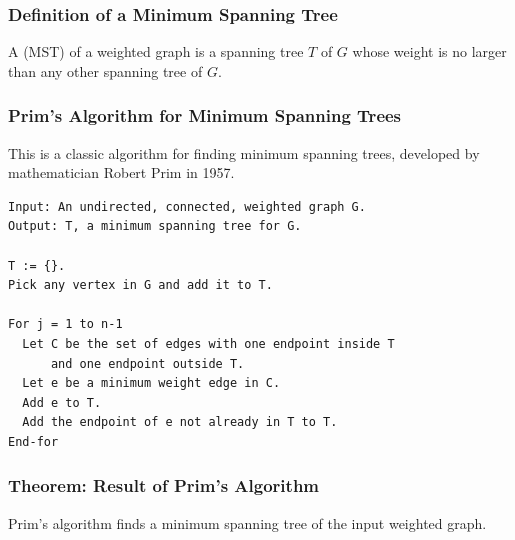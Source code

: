 \subsubsection*{Definition of a Minimum Spanning Tree}
A  (MST) of a weighted graph is a spanning tree $T$ of $G$ whose weight is no larger than any other spanning tree of $G$.

\subsubsection*{Prim's Algorithm for Minimum Spanning Trees}
This is a classic algorithm for finding minimum spanning trees, developed by mathematician Robert Prim in 1957.
\begin{lstlisting}
Input: An undirected, connected, weighted graph G.
Output: T, a minimum spanning tree for G.

T := {}.
Pick any vertex in G and add it to T.

For j = 1 to n-1
  Let C be the set of edges with one endpoint inside T 
      and one endpoint outside T.
  Let e be a minimum weight edge in C.
  Add e to T.
  Add the endpoint of e not already in T to T.
End-for
\end{lstlisting}

\subsubsection*{Theorem: Result of Prim's Algorithm}
Prim's algorithm finds a minimum spanning tree of the input weighted graph.